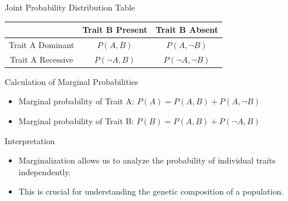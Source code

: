 \documentclass{beamer}
\begin{document}
\begin{frame}{Joint Probability Distribution Table}
  \begin{center}
    \begin{tabular}{|c|c|c|}
      \hline
      & Trait B Present & Trait B Absent \\
      \hline
      Trait A Dominant & $P(A, B)$ & $P(A, \neg B)$ \\
      \hline
      Trait A Recessive & $P(\neg A, B)$ & $P(\neg A, \neg B)$ \\
      \hline
    \end{tabular}
  \end{center}
\end{frame}

\begin{frame}{Calculation of Marginal Probabilities}
  \begin{itemize}
    \item Marginal probability of Trait A: $P(A) = P(A, B) + P(A, \neg B)$
    \item Marginal probability of Trait B: $P(B) = P(A, B) + P(\neg A, B)$
  \end{itemize}
\end{frame}

\begin{frame}{Interpretation}
  \begin{itemize}
    \item Marginalization allows us to analyze the probability of individual traits independently.
    \item This is crucial for understanding the genetic composition of a population.
  \end{itemize}
\end{frame}
\end{document}
